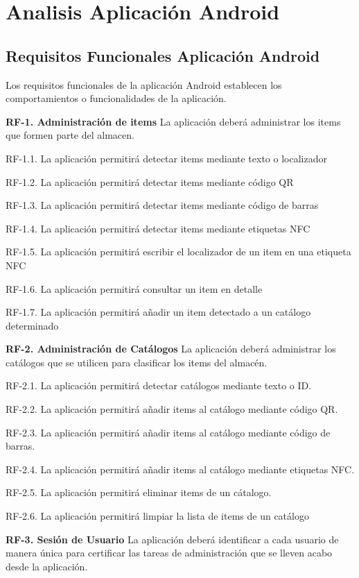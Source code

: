 \documentclass[a4paper,11pt]{book}
\begin{document}
\section{Analisis Aplicación Android}

\subsection{Requisitos Funcionales Aplicación Android}
Los requisitos funcionales de la aplicación Android establecen los comportamientos o funcionalidades de la aplicación.

\textbf{RF-1. Administración de items} La aplicación deberá administrar los items que formen parte del almacen.   

RF-1.1. La aplicación permitirá detectar items mediante texto o localizador
	
RF-1.2. La aplicación permitirá detectar items mediante código QR
	
RF-1.3. La aplicación permitirá detectar items mediante código de barras
	
RF-1.4. La aplicación permitirá detectar items mediante etiquetas NFC
	
RF-1.5. La aplicación permitirá escribir el localizador de un item en una etiqueta NFC
	
RF-1.6. La aplicación permitirá consultar un item en detalle
	
RF-1.7. La aplicación permitirá añadir un item detectado a un catálogo determinado
	


\textbf{RF-2. Administración de Catálogos} La aplicación deberá administrar los catálogos que se utilicen para clasificar los items del almacén.   


	RF-2.1. La aplicación permitirá detectar catálogos mediante texto o ID.
	
	RF-2.2. La aplicación permitirá añadir items  al catálogo mediante código QR.
	
	RF-2.3. La aplicación permitirá añadir items al catálogo mediante código de barras.

	RF-2.4. La aplicación permitirá añadir items al catálogo mediante etiquetas NFC.
	
	RF-2.5. La aplicación permitirá eliminar items de un cátalogo.
	
	RF-2.6. La aplicación permitirá limpiar la lista de items de un catálogo
	
	
\textbf{RF-3. Sesión de Usuario} La aplicación deberá identificar a cada usuario de manera única para certificar las tareas de administración que se lleven acabo desde la aplicación. 
\end{document}
